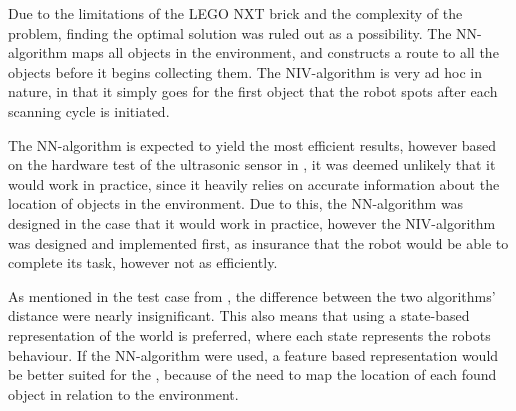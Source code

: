 Due to the limitations of the LEGO NXT brick and the complexity of the problem, finding the optimal solution was ruled out as a possibility. The NN-algorithm maps all objects in the environment, and constructs a route to all the objects before it begins collecting them. The NIV-algorithm is very ad hoc in nature, in that it simply goes for the first object that the robot spots after each scanning cycle is initiated. 

The NN-algorithm is expected to yield the most efficient results, however based on the hardware test of the ultrasonic sensor in , it was deemed unlikely that it would work in practice, since it heavily relies on accurate information about the location of objects in the environment. Due to this, the NN-algorithm was designed in the case that it would work in practice, however the NIV-algorithm was designed and implemented first, as insurance that the robot would be able to complete its task, however not as efficiently.

As mentioned in the test case from , the difference between the two algorithms' distance were nearly insignificant. This also means that using a state-based representation of the world is preferred, where each state represents the robots behaviour. If the NN-algorithm were used, a feature based representation would be better suited for the \projname{}, because of the need to map the location of each found object in relation to the environment.


